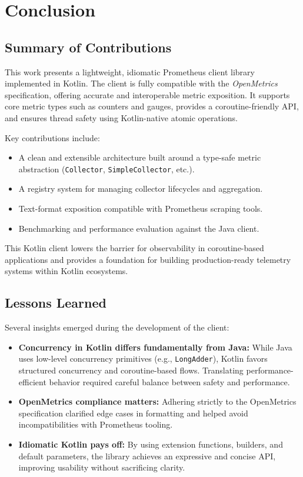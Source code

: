 \chapter{Conclusion} \label{cap:conclusion}

\section{Summary of Contributions}

This work presents a lightweight, idiomatic Prometheus client library implemented in Kotlin. The client is fully compatible with the \textit{OpenMetrics} specification, offering accurate and interoperable metric exposition. It supports core metric types such as counters and gauges, provides a coroutine-friendly API, and ensures thread safety using Kotlin-native atomic operations.

Key contributions include:
\begin{itemize}
  \item A clean and extensible architecture built around a type-safe metric abstraction (\texttt{Collector}, \texttt{SimpleCollector}, etc.).
  \item A registry system for managing collector lifecycles and aggregation.
  \item Text-format exposition compatible with Prometheus scraping tools.
  \item Benchmarking and performance evaluation against the Java client.
\end{itemize}

This Kotlin client lowers the barrier for observability in coroutine-based applications and provides a foundation for building production-ready telemetry systems within Kotlin ecosystems.

\section{Lessons Learned}

Several insights emerged during the development of the client:
\begin{itemize}
  \item \textbf{Concurrency in Kotlin differs fundamentally from Java:} While Java uses low-level concurrency primitives (e.g., \texttt{LongAdder}), Kotlin favors structured concurrency and coroutine-based flows. Translating performance-efficient behavior required careful balance between safety and performance.
  \item \textbf{OpenMetrics compliance matters:} Adhering strictly to the OpenMetrics specification clarified edge cases in formatting and helped avoid incompatibilities with Prometheus tooling.
  \item \textbf{Idiomatic Kotlin pays off:} By using extension functions, builders, and default parameters, the library achieves an expressive and concise API, improving usability without sacrificing clarity.
\end{itemize}

